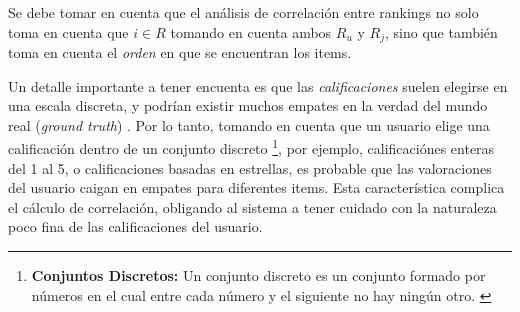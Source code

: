 \begin{itemize}
\begin{itemize}[label=$\diamond$]
            Se debe tomar en cuenta que el análisis de correlación entre rankings no solo toma en cuenta que $i \in R$ tomando en cuenta ambos $R_u$ y $R_j$, sino que también toma en cuenta el \textit{orden} en que se encuentran los items.
            
            Un detalle importante a tener encuenta es que las \textit{calificaciones} suelen elegirse en una escala discreta, y podrían existir muchos empates en la verdad del mundo real (\textit{ground truth}) \parencite{Aggarwal2016}.
            Por lo tanto, tomando en cuenta que un usuario elige una calificación dentro de un conjunto discreto \footnote{\textbf{Conjuntos Discretos: } Un conjunto discreto es un conjunto formado por números en el cual entre cada número y el siguiente no hay ningún otro. \parencite{Perez_MAT_2021}}, por ejemplo, calificaciónes enteras del 1 al 5, o calificaciones basadas en estrellas, es probable que las valoraciones del usuario caigan en empates para diferentes items.
            Esta característica complica el cálculo de correlación, obligando al sistema a tener cuidado con la naturaleza poco fina de las calificaciones del usuario. 

            \newpage
            \thispagestyle{plain}
            \vspace*{0.2cm}

            
            \end{itemize}
                
        \end{itemize}



